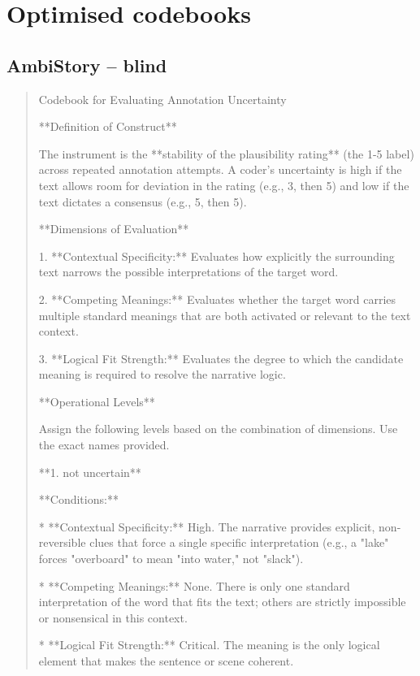 \section{Optimised codebooks}
\label{app:codebooks}
\subsection*{AmbiStory -- blind}
\begin{quote}\small
Codebook for Evaluating Annotation Uncertainty



**Definition of Construct**

The instrument is the **stability of the plausibility rating** (the 1-5 label) across repeated annotation attempts. A coder's uncertainty is high if the text allows room for deviation in the rating (e.g., 3, then 5) and low if the text dictates a consensus (e.g., 5, then 5).



**Dimensions of Evaluation**

1.  **Contextual Specificity:** Evaluates how explicitly the surrounding text narrows the possible interpretations of the target word.

2.  **Competing Meanings:** Evaluates whether the target word carries multiple standard meanings that are both activated or relevant to the text context.

3.  **Logical Fit Strength:** Evaluates the degree to which the candidate meaning is required to resolve the narrative logic.



**Operational Levels**

Assign the following levels based on the combination of dimensions. Use the exact names provided.



**1. not uncertain**

**Conditions:**

*   **Contextual Specificity:** High. The narrative provides explicit, non-reversible clues that force a single specific interpretation (e.g., a "lake" forces "overboard" to mean "into water," not "slack").

*   **Competing Meanings:** None. There is only one standard interpretation of the word that fits the text; others are strictly impossible or nonsensical in this context.

*   **Logical Fit Strength:** Critical. The meaning is the only logical element that makes the sentence or scene coherent.


\end{quote}
